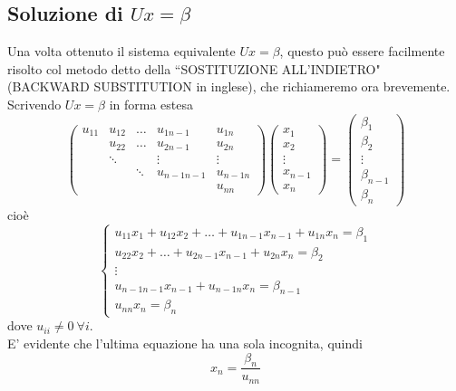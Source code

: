 \subsection{Soluzione di $Ux=\beta$}
Una volta ottenuto il sistema equivalente $Ux=\beta$, questo può essere facilmente risolto col metodo detto della ``SOSTITUZIONE ALL'INDIETRO" (BACKWARD SUBSTITUTION in inglese), che richiameremo ora brevemente. \\
Scrivendo $Ux=\beta$ in forma estesa
\begin{equation*}
    \begin{pmatrix}
        u_{11} & u_{12} & \dots & u_{1n-1} & u_{1n} \\ 
        & u_{22} & \dots & u_{2n-1} & u_{2n} \\ 
        & \ddots &  & \vdots & \vdots \\ 
        &  & \ddots  & u_{n-1n-1} & u_{n-1n} \\ 
        &  &  &  & u_{nn} 
    \end{pmatrix} 
    \begin{pmatrix}
        x_1 \\ 
        x_2 \\ 
        \vdots \\ 
        x_{n-1} \\ 
        x_n 
    \end{pmatrix} = 
    \begin{pmatrix}
        \beta_1 \\ 
        \beta_2 \\ 
        \vdots \\ 
        \beta_{n-1} \\ 
        \beta_n 
    \end{pmatrix}
\end{equation*}
cioè
\begin{equation*}
    \begin{cases}
u_{11}x_1 +u_{12}x_2 + \dots + u_{1n-1}x_{n-1} + u_{1n}x_n = \beta_1\\ 
 u_{22}x_2 + \dots +u_{2n-1}x_{n-1} + u_{2n}x_n = \beta_2\\ 
\vdots  \\ 
 u_{n-1n-1}x_{n-1} + u_{n-1n}x_n = \beta_{n-1}\\ 
 u_{nn}x_n = \beta_{n}
\end{cases}
\end{equation*}
dove $u_{ii}\neq 0 \ \forall i$.\\
E' evidente che l'ultima equazione ha una sola incognita, quindi 
\begin{equation*}
    x_n = \frac{\beta_n}{u_{nn}}
\end{equation*}

